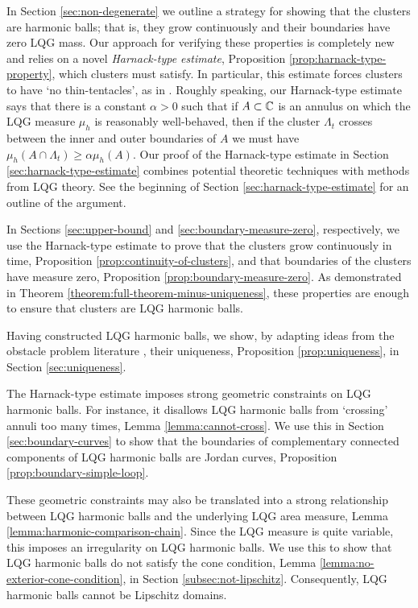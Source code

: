 \documentclass[12pt]{amsart}
\numberwithin{equation}{section}
\begin{document}
	In Section \ref{sec:non-degenerate} we outline a strategy for showing that the clusters are harmonic balls; that is, they grow continuously and their boundaries have zero LQG mass.   Our approach for verifying these properties is completely new and relies on a novel {\it Harnack-type estimate}, Proposition \ref{prop:harnack-type-property},
	which clusters must satisfy. In particular, this estimate forces clusters to have `no thin-tentacles', as in \cite{jerison2013internal}. Roughly speaking, our Harnack-type estimate says that there is a constant $\alpha > 0$ such that if $A \subset \mathbb{C}$ is an annulus on which the LQG measure $\mu_h$ is reasonably well-behaved, then if the cluster $\Lambda_t$ crosses between the inner and outer boundaries of $A$ we must have $\mu_h(A \cap \Lambda_t) \geq \alpha \mu_h(A)$.
	Our proof of the Harnack-type estimate in Section \ref{sec:harnack-type-estimate} combines potential theoretic techniques 
	with methods from LQG theory. See the beginning of Section \ref{sec:harnack-type-estimate} for an outline of the argument.
	
	In Sections \ref{sec:upper-bound} and \ref{sec:boundary-measure-zero}, respectively, we use the Harnack-type estimate to prove that the clusters grow continuously in time, Proposition \ref{prop:continuity-of-clusters}, and that boundaries of the clusters have measure zero,
	Proposition \ref{prop:boundary-measure-zero}. As demonstrated in Theorem \ref{theorem:full-theorem-minus-uniqueness}, these properties are enough to ensure that 
	clusters are LQG harmonic balls. 
	
	Having constructed LQG harmonic balls, we show, by adapting ideas from the obstacle problem literature \cite{sakai2006quadrature}, their uniqueness,
	Proposition \ref{prop:uniqueness}, in Section \ref{sec:uniqueness}.
	
	The Harnack-type estimate imposes strong geometric constraints on LQG harmonic balls. For instance, 
	it disallows LQG harmonic balls from `crossing' annuli too many times, Lemma \ref{lemma:cannot-cross}. We use this in Section \ref{sec:boundary-curves} to show 
	that the boundaries of complementary connected components of LQG harmonic balls are Jordan curves, Proposition \ref{prop:boundary-simple-loop}. 
	
	These geometric constraints may also be translated into a strong relationship between LQG harmonic balls and the underlying LQG area measure,
	Lemma \ref{lemma:harmonic-comparison-chain}.
	Since the LQG measure is quite variable, this imposes an irregularity on LQG harmonic balls. We use this to show 
	that LQG harmonic balls do not satisfy the cone condition, Lemma \ref{lemma:no-exterior-cone-condition}, in Section \ref{subsec:not-lipschitz}.
	Consequently, LQG harmonic balls cannot be Lipschitz domains. 
	
\end{document}
